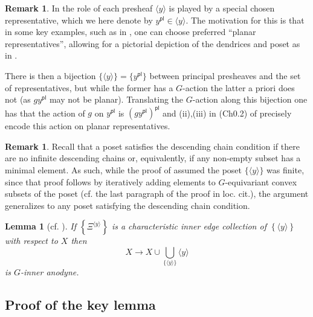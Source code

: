 \documentclass[a4paper,10pt
,draft
]{article}%
\numberwithin{equation}{section}
\numberwithin{figure}{section}
\newtheorem{lemma}[equation]{Lemma}%
\theoremstyle{definition} %
\newtheorem{remark}[equation]{Remark}%
\newcommand{\1}{\ensuremath{\mathbbm 1}}%
\begin{document}
\begin{remark}\label{CH02 REM}
	In \cite[Rem. 3.7]{BP_edss} the role of each presheaf 
	$\langle y \rangle$ is played by a special chosen representative,
	which we here denote by
	$y^{\mathsf{pl}} \in \langle y \rangle$. 
	The motivation for this is that in some key examples, such as in \cite[Ex. 3.9]{BP_edss}, one can choose preferred ``planar representatives'',
	allowing for a pictorial depiction of the dendrices and poset as in
	\cite[Fig. 3.1]{BP_edss}. 
	
	There is then a bijection $\{\langle y \rangle\} = \{ y^{\mathsf{pl}}\}$ between principal presheaves and the set of representatives, but while the former has a $G$-action the latter a priori does not (as $gy^{\mathsf{pl}}$ may not be planar). Translating the $G$-action along this bijection one has that the action of $g$ on $y^{\mathsf{pl}}$ is
	$(g y^{\mathsf{pl}})^{\mathsf{pl}}$ and (ii),(iii) in 
	(Ch0.2) of \cite[Rem. 3.7]{BP_edss} precisely 
	encode this action on planar representatives.
\end{remark}

\begin{remark}\label{DCC REM}
	Recall that a poset satisfies the descending chain condition if there are no infinite descending chains or, equivalently, if any non-empty subset has a minimal element. As such, while the proof of \cite[Lemma 3.4]{BP_edss}
	assumed the poset $\{\langle y \rangle\}$ was finite,
	since that proof follows by iteratively adding elements to $G$-equivariant convex subsets of the poset (cf. the last paragraph of the proof in loc. cit.), the argument generalizes to any poset satisfying the descending chain condition.
\end{remark}

\begin{lemma}[{cf. \cite[Lemma 3.4]{BP_edss}}]
	\label{CHAREDGE LEM}
	If
	$
	\left\{ \Xi^{\langle y \rangle} \right \} 
	$
	is a \emph{characteristic inner edge collection} 
	of $\left\{ \langle y \rangle \right\}$ with respect to $X$ then
	\begin{equation}\label{CHAREDGE EQ}
	X \to X \cup \bigcup_{\{\langle y \rangle\}} \langle y \rangle
	\end{equation}
	is $G$-inner anodyne.
\end{lemma}




\subsection{Proof of the key lemma}
\end{document}
